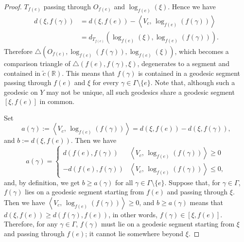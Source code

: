 \documentclass[12pt]{amsart}
\numberwithin{equation}{section}
\theoremstyle{plain}
\theoremstyle{definition}
\theoremstyle{remark}
\newcommand{\R}{{\mathbb R}}
\newcommand{\tcprj}{\log}
\newcommand{\inner}[2]{\left\langle #1,\, #2 \right\rangle}
\newcommand{\tri}[3]{\triangle(#1,#2,#3)}
\begin{document}
\begin{proof}
$T_{f(e)}$ passing through $O_{f(e)}$ and $\tcprj_{f(e)}(\xi)$.
Hence we have
\begin{equation*}
\begin{split}
  d(\xi,f(\gamma)) &=
  d(\xi,f(e))-\inner{V_c}{\tcprj_{f(e)}(f(\gamma))} \\
 & = d_{T_{f(e)}}(\tcprj_{f(e)}(\xi), \tcprj_{f(e)}(f(\gamma))). 
\end{split}
\end{equation*}
Therefore 
$\tri{O_{f(e)}}{\tcprj_{f(e)}(f(\gamma))}{\tcprj_{f(e)}(\xi)}$, 
which becomes a comparison triangle of $\tri{f(e)}{f(\gamma)}{\xi}$, 
degenerates to a segment and contained in $\tilde c(\R)$. 
This means that $f(\gamma)$ is contained in a geodesic segment passing through 
$f(e)$ and $\xi$ for every $\gamma \in \Gamma\setminus \{e\}$. 
Note that, although such a geodesic on $Y$ may not be unique, all such
geodesics share a geodesic segment $[\xi, f(e)]$ in common. 

Set 
\begin{equation*}
 a(\gamma):=  \inner{V_c}{\tcprj_{f(e)}(f(\gamma))}
  = d(\xi,f(e))-d(\xi,f(\gamma)), 
\end{equation*}
and $b:=d(\xi,f(e))$.
Then we have
\begin{equation*}
a(\gamma)=
\begin{cases}
d(f(e),f(\gamma))  &
 \inner{V_c}{\tcprj_{f(e)}(f(\gamma))} \geq 0 \\
-d(f(e),f(\gamma))  &
 \inner{V_c}{\tcprj_{f(e)}(f(\gamma))} \leq 0, 
\end{cases}
\end{equation*}
and, by definition, we get $b \geq a(\gamma)$ 
for all $\gamma \in \Gamma \setminus \{e\}$.
Suppose that, for $\gamma \in \Gamma$, $f(\gamma)$ lies on a
geodesic segment starting from $f(e)$ and passing through $\xi$. 
Then we have $\inner{V_c}{\tcprj_{f(e)}(f(\gamma))}\geq 0$, 
and $b\geq a(\gamma)$ means that 
$d(\xi,f(e))\geq d(f(\gamma),f(e))$, in other words,
$f(\gamma) \in [\xi,f(e)]$. 
Therefore, for any $\gamma \in \Gamma$, 
$f(\gamma)$ must lie on a geodesic segment starting from $\xi$
and passing through $f(e)$; it cannot lie somewhere beyond $\xi$. 


\end{proof}
\end{document}
